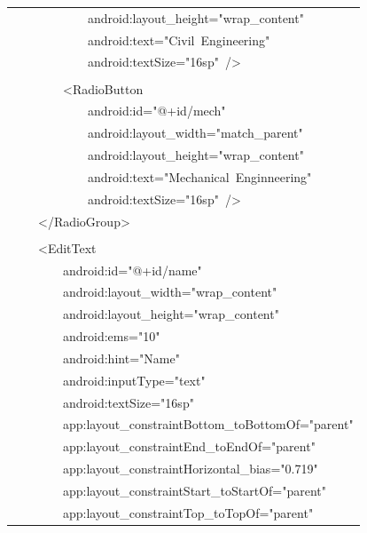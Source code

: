 \documentclass[a4paper,12pt]{article}
\begin{document}
\begin{longtable}{|p{}|}
{\ttfamily\small \ \ \ \ \ \ \ \ \ \ \ \ android:layout\_height="wrap\_content"} \\
{\ttfamily\small \ \ \ \ \ \ \ \ \ \ \ \ android:text="Civil\ Engineering"} \\
{\ttfamily\small \ \ \ \ \ \ \ \ \ \ \ \ android:textSize="16sp"\ /\textgreater{}} \\
\strut \\
{\ttfamily\small \ \ \ \ \ \ \ \ \textless{}RadioButton} \\
{\ttfamily\small \ \ \ \ \ \ \ \ \ \ \ \ android:id="@+id/mech"} \\
{\ttfamily\small \ \ \ \ \ \ \ \ \ \ \ \ android:layout\_width="match\_parent"} \\
{\ttfamily\small \ \ \ \ \ \ \ \ \ \ \ \ android:layout\_height="wrap\_content"} \\
{\ttfamily\small \ \ \ \ \ \ \ \ \ \ \ \ android:text="Mechanical\ Enginneering"} \\
{\ttfamily\small \ \ \ \ \ \ \ \ \ \ \ \ android:textSize="16sp"\ /\textgreater{}} \\
{\ttfamily\small \ \ \ \ \textless{}/RadioGroup\textgreater{}} \\
\strut \\
{\ttfamily\small \ \ \ \ \textless{}EditText} \\
{\ttfamily\small \ \ \ \ \ \ \ \ android:id="@+id/name"} \\
{\ttfamily\small \ \ \ \ \ \ \ \ android:layout\_width="wrap\_content"} \\
{\ttfamily\small \ \ \ \ \ \ \ \ android:layout\_height="wrap\_content"} \\
{\ttfamily\small \ \ \ \ \ \ \ \ android:ems="10"} \\
{\ttfamily\small \ \ \ \ \ \ \ \ android:hint="Name"} \\
{\ttfamily\small \ \ \ \ \ \ \ \ android:inputType="text"} \\
{\ttfamily\small \ \ \ \ \ \ \ \ android:textSize="16sp"} \\
{\ttfamily\small \ \ \ \ \ \ \ \ app:layout\_constraintBottom\_toBottomOf="parent"} \\
{\ttfamily\small \ \ \ \ \ \ \ \ app:layout\_constraintEnd\_toEndOf="parent"} \\
{\ttfamily\small \ \ \ \ \ \ \ \ app:layout\_constraintHorizontal\_bias="0.719"} \\
{\ttfamily\small \ \ \ \ \ \ \ \ app:layout\_constraintStart\_toStartOf="parent"} \\
{\ttfamily\small \ \ \ \ \ \ \ \ app:layout\_constraintTop\_toTopOf="parent"} \\

\end{longtable}
\end{document}

